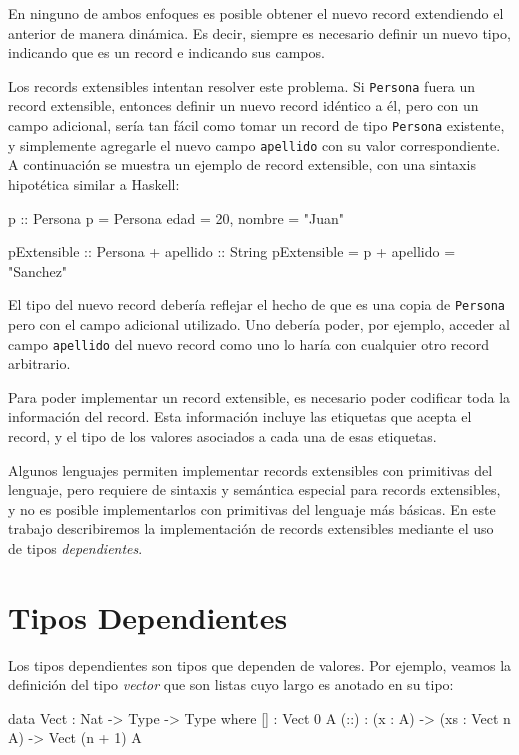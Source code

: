En ninguno de ambos enfoques es posible obtener el nuevo record extendiendo el anterior de manera dinámica. Es decir, siempre es necesario definir un nuevo tipo, indicando que es un record e indicando sus campos.

Los records extensibles intentan resolver este problema. Si \texttt{Persona} fuera un record extensible, entonces definir un nuevo record idéntico a él, pero con un campo adicional, sería tan fácil como tomar un record de tipo \texttt{Persona} existente, y simplemente agregarle el nuevo campo \texttt{apellido} con su valor correspondiente. A continuación se muestra un ejemplo de record extensible, con una sintaxis hipotética similar a Haskell:

\begin{code}
p :: Persona
p = Persona { edad = 20, nombre = "Juan" }

pExtensible :: Persona + { apellido :: String }
pExtensible = p + { apellido = "Sanchez" }
\end{code}

El tipo del nuevo record debería reflejar el hecho de que es una copia de \texttt{Persona} pero con el campo adicional utilizado. Uno debería poder, por ejemplo, acceder al campo \texttt{apellido} del nuevo record como uno lo haría con cualquier otro record arbitrario.

Para poder implementar un record extensible, es necesario poder codificar toda la información del record. Esta información incluye las etiquetas que acepta el record, y el tipo de los valores asociados a cada una de esas etiquetas. 

Algunos lenguajes permiten implementar records extensibles con primitivas del lenguaje, pero requiere de sintaxis y semántica especial para records extensibles, y no es posible implementarlos con primitivas del lenguaje más básicas. En este trabajo describiremos la implementación de records extensibles mediante el uso de tipos \textit{dependientes}.

\section{Tipos Dependientes}

Los tipos dependientes son tipos que dependen de valores. Por ejemplo, veamos la definición del tipo \textit{vector} que son listas cuyo largo es anotado en su tipo:

\begin{code}
data Vect : Nat -> Type -> Type where
  [] : Vect 0 A
  (::) : (x : A) -> (xs : Vect n A) -> Vect (n + 1) A
\end{code}

